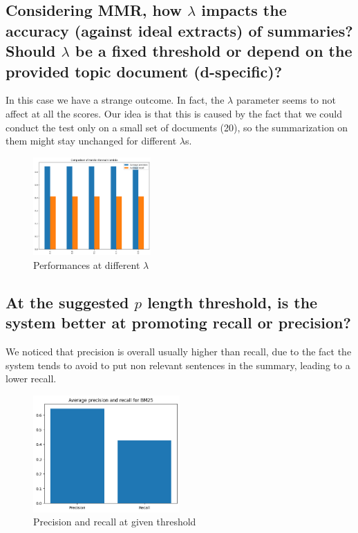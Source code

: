\subsection{Considering MMR, how $\lambda$ impacts the accuracy (against ideal extracts) of summaries? Should $\lambda$ be a fixed threshold or depend on the provided topic document (d-specific)?}
In this case we have a strange outcome. In fact, the $\lambda$ parameter seems to not affect at all the scores. Our idea is that this is caused by the fact that we could conduct the test only on a small set of documents (20), so the summarization on them might stay unchanged for different $\lambda$s.
\begin{figure}[h]
    \centering
    \includegraphics[width=0.4\textwidth]{images/lambda_metrics.png}
    \caption{Performances at different $\lambda$}
    \label{fig:MMR performance}    
\end{figure}
\subsection{At the suggested $p$ length threshold, is the system better at promoting recall or precision?}
We noticed that precision is overall usually higher than recall, due to the fact the system tends to avoid to put non relevant sentences in the summary, leading to a lower recall.

\begin{figure}[h]
    \centering
    \includegraphics[width=0.5\textwidth]{images/pre_rec.png}
    \caption{Precision and recall at given threshold}
    \label{fig:Precision and recall}
\end{figure}